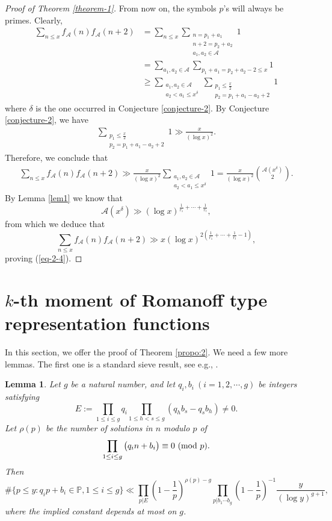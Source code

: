 \documentclass[12pt,a4paper,reqno]{amsart}
\numberwithin{equation}{section}
\def\pmod #1{\ ({\rm{mod}}\ #1)}
\theoremstyle{plain}
\newtheorem{lemma}{Lemma}
\theoremstyle{definition}
\begin{document}
\begin{proof}[Proof of Theorem \ref{theorem-1}]
From now on, the symbols $p$'s will always be primes. Clearly,
\begin{align*}
\sum_{n\le x} f_{\mathcal{A}}(n)f_{\mathcal{A}}(n+2)&=\sum_{n\le x}\sum_{\substack{n=p_1+a_1\\ n+2=p_2+a_2\\ a_1, a_2\in \mathcal{A}}}1\\
&=\sum_{a_1, a_2\in \mathcal{A}}\sum_{p_1+a_1=p_2+a_2-2\le x}1\\
&\ge \sum_{\substack{a_1, a_2\in \mathcal{A}\\a_2<a_1\le x^\delta}}\sum_{\substack{p_1\le \frac{x}{2}\\ p_2=p_1+a_1-a_2+2}}1
\end{align*}
where $\delta$ is the one occurred in Conjecture \ref{conjecture-2}. By Conjecture \ref{conjecture-2}, we have
\begin{align*}
\sum_{\substack{p_1\le \frac{x}{2}\\ p_2=p_1+a_1-a_2+2}}1\gg \frac{x}{(\log x)^2}.
\end{align*}
Therefore, we conclude that
\begin{align*}
\sum_{n\le x} f_{\mathcal{A}}(n)f_{\mathcal{A}}(n+2)\gg \frac{x}{(\log x)^2}\sum_{\substack{a_1, a_2\in \mathcal{A}\\a_2<a_1\le x^\delta}}1=\frac{x}{(\log x)^2}\binom{\mathcal{A}\left(x^\delta\right)}{2}.
\end{align*}
By Lemma \ref{lem1} we know that
$$
\mathcal{A}\left(x^\delta\right)\gg (\log x)^{\frac{1}{r_1}+\cdots+\frac{1}{r_t}},
$$
from which we deduce that
$$
\sum_{n\le x} f_{\mathcal{A}}(n)f_{\mathcal{A}}(n+2)\gg x(\log x)^{2\left(\frac{1}{r_1}+\cdots+\frac{1}{r_t}-1\right)},
$$
proving (\ref{eq-2-4}).
\end{proof}

\section{$k$-th moment of Romanoff type representation functions}
In this section, we offer the proof of Theorem \ref{propo:2}.
We need a few more lemmas. The first one is a standard sieve result, see e.g., \cite[Theorem 2.4, p. 76]{Halberstam}.

\begin{lemma}\label{lem-2}
Let $g$ be a natural number, and let $q_i, b_i~(i=1, 2, \cdots, g)$ be integers satisfying
$$
E:=\prod_{1\le i\le g}q_i\prod_{1\le h<s\le g}\left(q_hb_s-q_sb_h\right)\neq 0.
$$
Let $\rho(p)$ be the number of solutions in $n$ modulo $p$ of
$$
\prod_{1\le i\le g}\big(q_in+b_i\big)\equiv 0\pmod{p}.
$$
Then
$$
\#\big\{p\le y: q_ip+b_i\in \mathbb{P}, 1\le i\le g\big\}\ll \prod_{p|E}\left(1-\frac{1}{p}\right)^{\rho(p)-g}\prod_{p|b_1\cdots b_g}\left(1-\frac{1}{p}\right)^{-1}\frac{y}{(\log y)^{g+1}},
$$
where the implied constant depends at most on $g$.
\end{lemma}
\end{document}
